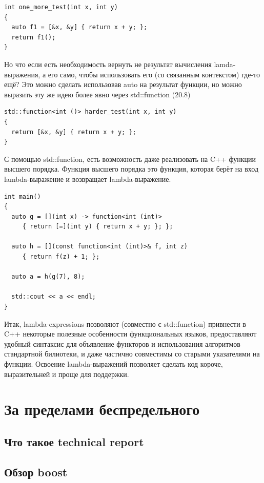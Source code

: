 \documentclass[a4paper,12pt,oneside]{article}
\begin{document}
\begin{lstlisting}
int one_more_test(int x, int y)
{
  auto f1 = [&x, &y] { return x + y; };
  return f1(); 
}
\end{lstlisting}

Но что если есть необходимость вернуть не результат вычисления lamda-выражения, а его само, чтобы использовать его (со связанным контекстом) где-то ещё? Это можно сделать использовав auto на результат функции, но можно выразить эту же идею более явно через std::function (20.8)
 
\begin{lstlisting}
std::function<int ()> harder_test(int x, int y)
{
  return [&x, &y] { return x + y; };
}
\end{lstlisting}

С помощью std::function, есть возможность даже реализовать на C++ функции высшего порядка. Функция высшего порядка это функция, которая берёт на вход lambda-выражение и возвращает lambda-выражение.

\begin{lstlisting}
int main()
{
  auto g = [](int x) -> function<int (int)> 
     { return [=](int y) { return x + y; }; };

  auto h = [](const function<int (int)>& f, int z) 
     { return f(z) + 1; };

  auto a = h(g(7), 8);

  std::cout << a << endl;
}
\end{lstlisting}

Итак, lambda-expressions позволяют (совместно с std::function) привнести в C++ некоторые полезные особенности функциональных языков, предоставляют удобный синтаксис для объявление функторов и использования алгоритмов стандартной билиотеки, и даже частично совместимы со старыми указателями на функции. Освоение lambda-выражений позволяет сделать код короче, выразительней и проще для поддержки.

\pagebreak
\section{За пределами беспредельного}

\subsection{Что такое technical report}

\subsection{Обзор boost}
\end{document}
